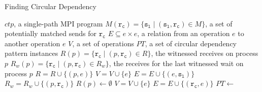 \begin{algorithm}
\caption{Finding Circular Dependency}\label{algo:circular}
\begin{algorithmic}[1]
\Require $\mathit{ctp}$, a single-path MPI program
\Require $\mathit{M}(\mathtt{r_c}) = \{\mathtt{s_l}\mid(\mathtt{s_l},\mathtt{r_c})\in\mathit{M}\}$, a set of potentially matched sends for $\mathtt{r_c}$
\State $\mathit{E} \subseteq \mathit{e}\times\mathit{e}$, a relation from an operation $\mathit{e}$ to another operation $\mathit{e}$
\State $\mathit{V}$, a set of operations
\State $\mathit{PT}$, a set of circular dependency pattern instances
\State $\mathit{R}(p) = \{\mathtt{r_c}\mid(p,\mathtt{r_c})\in\mathit{R}\}$, the witnessed receives on process $p$
\State $\mathit{R_w}(p) = \{\mathtt{r_c}\mid(p,\mathtt{r_c})\in\mathit{R_w}\}$, the receives for the last witnessed wait on process $p$ 
\State $\mathit{R} = \mathit{R} \cup \{(p,\mathit{e})\}$
\State $\mathit{V} = \mathit{V} \cup \{\mathit{e}\}$
 
\State $\mathit{E} = \mathit{E} \cup \{(\mathit{e},\mathtt{s_l})\}$  
\EndFor
\EndIf
{}
\State $\mathit{R_w} = \mathit{R_w} \cup \{(p,\mathtt{r_c})\}$
\EndFor
\State $\mathit{R}(p) \gets \emptyset$ 
\EndIf
{}
\State $\mathit{V} = \mathit{V} \cup \{\mathit{e}\}$
  
\State $\mathit{E} = \mathit{E} \cup \{(\mathtt{r_c},\mathit{e})\}$
\EndFor
\EndIf
\EndFor
\EndFor
\State $\mathit{PT} \gets$ 
\end{algorithmic}
\end{algorithm}

